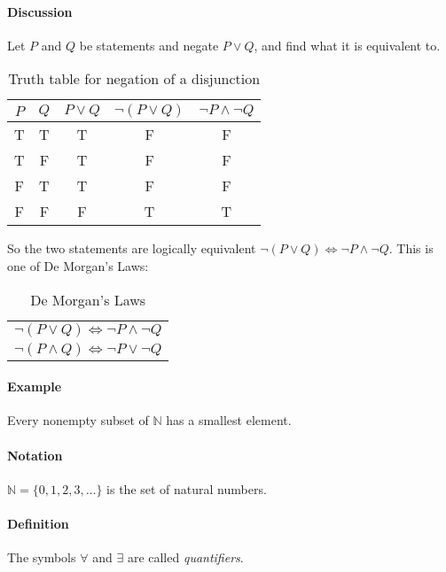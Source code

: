 \documentclass[../main.tex]{subfiles}
\begin{document}
\paragraph{Discussion}

Let $P$ and $Q$ be statements and negate $P \lor Q$, and find what it is equivalent to.

\begin{table}[ht]
    \centering
    \begin{tabular}{c|c|c|c|c}
        $P$ & $Q$ & $P \lor Q$ & $\neg(P \lor Q)$ & $\neg P \land \neg Q$ \\
        \hline
        T & T & T & F & F \\
        T & F & T & F & F \\
        F & T & T & F & F \\
        F & F & F & T & T
    \end{tabular}
    \caption{Truth table for negation of a disjunction}
\end{table}

So the two statements are logically equivalent $\neg(P \lor Q) \Longleftrightarrow \neg P \land \neg Q$.
This is one of De Morgan's Laws:

\begin{table}[ht]
    \centering
    \begin{tabular}{c}
        $\neg(P \lor Q) \Longleftrightarrow \neg P \land \neg Q$ \\
        $\neg(P \land Q) \Longleftrightarrow \neg P \lor \neg Q$
    \end{tabular}
    \caption{De Morgan's Laws}
\end{table}

\newpage
\paragraph{Example}

Every nonempty subset of $\mathbb{N}$ has a smallest element.

\paragraph{Notation} $\mathbb{N} = \{0, 1, 2, 3, \dots\}$ is the set of natural numbers.

\paragraph{Definition} The symbols $\forall$ and $\exists$ are called \emph{quantifiers}.
\end{document}
